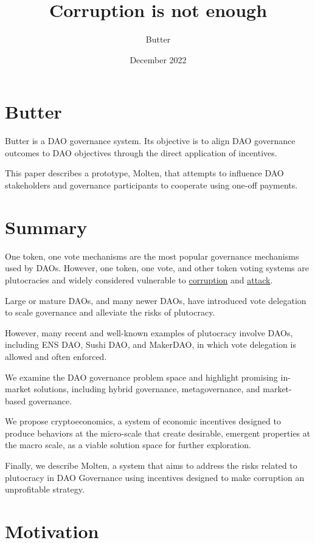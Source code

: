 \documentclass[
]{article}
\title{Corruption is not enough}
\author{Butter}
\date{December 2022}
\begin{document}
\maketitle
\setcounter{tocdepth}{2}
\tableofcontents

\hypertarget{butter}{%
\section{Butter}\label{butter}}

Butter is a DAO governance system. Its objective is to align DAO
governance outcomes to DAO objectives through the direct application of
incentives.

This paper describes a prototype, Molten, that attempts to influence DAO
stakeholders and governance participants to cooperate using one-off
payments.

\hypertarget{summary}{%
\section{Summary}\label{summary}}

One token, one vote mechanisms are the most popular governance
mechanisms used by DAOs. However, one token, one vote, and other token
voting systems are plutocracies and widely considered vulnerable to
\href{./problems.md\#corruption-problems}{corruption} and
\href{./problems.md\#attack-problems}{attack}.

Large or mature DAOs, and many newer DAOs, have introduced vote
delegation to scale governance and alleviate the risks of plutocracy.

However, many recent and well-known examples of plutocracy involve DAOs,
including ENS DAO, Sushi DAO, and MakerDAO, in which vote delegation is
allowed and often enforced.

We examine the DAO governance problem space and highlight promising
in-market solutions, including hybrid governance, metagovernance, and
market-based governance.

We propose cryptoeconomics, a system of economic incentives designed to
produce behaviors at the micro-scale that create desirable, emergent
properties at the macro scale, as a viable solution space for further
exploration.

Finally, we describe Molten, a system that aims to address the risks
related to plutocracy in DAO Governance using incentives designed to
make corruption an unprofitable strategy.
\hypertarget{motivation}{%
\section{Motivation}\label{motivation}}
\end{document}
